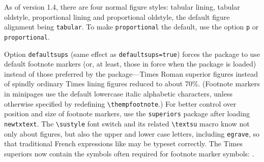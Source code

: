 \documentclass[\fsc]{article}
\theoremstyle{oldplain}
\theoremstyle{plain}
\begin{document}
As of version 1.4, there are four normal figure styles: tabular lining, tabular oldstyle, proportional lining and proportional oldstyle, the default figure alignment being \texttt{tabular}. To make \texttt{proportional} the default, use the option \texttt{p} or \texttt{proportional}.

Option {\tt defaultsups} (same effect as {\tt defaultsups=true}) forces the package to use default footnote markers (or, at least, those in force when the package is loaded) instead of those preferred by the package---Times Roman superior figures instead of spindly ordinary Times lining figures reduced to about 70\%. (Footnote markers in minipages use the default lowercase italic alphabetic characters, unless otherwise specified by redefining \verb|\thempfootnote|.) For better control over position and size of footnote markers, use the {\tt superiors} package after loading {\tt newtxtext}. The \verb|\sustyle| font switch and its related \verb|\textsu| macro know not only about figures, but also the upper and lower case letters, including \texttt{egrave}, so that traditional French expressions like  may be typeset correctly. The Times superiors now contain the symbols often required for footnote marker symbols: \textsu{\textasteriskcentered\textdagger\textdaggerdbl\textsection\textparagraph\textbardbl}.
\end{document}
